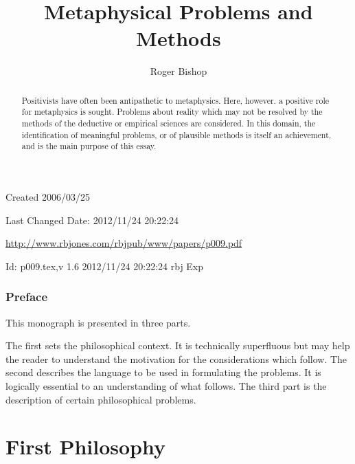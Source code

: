 \documentclass{rbjk}
\begin{document}
                                                                                   
\begin{article}
\begin{opening}  
\title{Metaphysical Problems and Methods}
\author{Roger Bishop }

\begin{abstract}
Positivists have often been antipathetic to metaphysics.
Here, however. a positive role for metaphysics is sought.
Problems about reality which may not be resolved by the methods of the deductive or empirical sciences are considered.
In this domain, the identification of meaningful problems, or of plausible methods is itself an achievement, and is the main purpose of this essay. 
\end{abstract}
\end{opening}

\vfill

\begin{centering}
{\footnotesize
Created 2006/03/25

Last Changed $ $Date: 2012/11/24 20:22:24 $ $

\href{http://www.rbjones.com/rbjpub/www/papers/p009.pdf}
{http://www.rbjones.com/rbjpub/www/papers/p009.pdf}

$ $Id: p009.tex,v 1.6 2012/11/24 20:22:24 rbj Exp $ $

}%
\end{centering}

\newpage
\setcounter{tocdepth}{4}
{\parskip-0pt\tableofcontents}

\section{Preface}

This monograph is presented in three parts.

The first sets the philosophical context.
It is technically superfluous but may help the reader to understand the motivation for the considerations which follow.
The second describes the language to be used in formulating the problems.
It is logically essential to an understanding of what follows.
The third part is the description of certain philosophical problems.

\part{First Philosophy}


\end{article}
\end{document}

